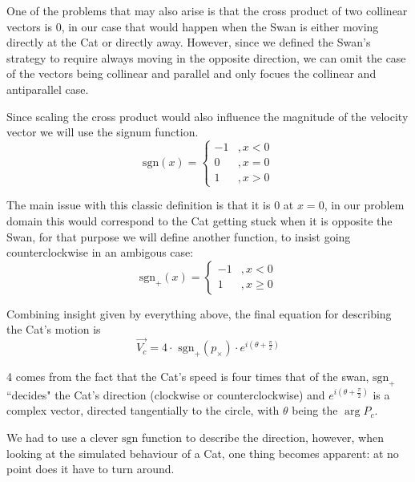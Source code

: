\documentclass[12pt]{article}
\begin{document}
One of the problems that may also arise is that the cross product of two collinear\citep{vectorterminology} vectors is $0$, in our case that would happen when the Swan is either moving directly at the Cat or directly away. However, since we defined the Swan's strategy to require always moving in the opposite direction, we can omit the case of the vectors being collinear and parallel\citep{vectorterminology} and only focues the collinear and antiparallel\citep{vectorterminology} case.

Since scaling the cross product would also influence the magnitude of the velocity vector we will use the signum function. \begin{equation}\text{sgn}(x) = \left\{ 
	\begin{aligned}
		-1&, x < 0\\
		0&, x = 0\\
		1&, x > 0
	\end{aligned}
\right.\end{equation}

The main issue with this classic definition is that it is $0$ at $x = 0$, in our problem domain this would correspond to the Cat getting stuck when it is opposite the Swan, for that purpose we will define another function, to insist going counterclockwise in an ambigous case:\begin{equation}\text{sgn}_+(x) = \left\{ 
	\begin{aligned}
		-1&, x < 0\\
		1&, x \geq 0
	\end{aligned}
\right.\end{equation}

Combining insight given by everything above, the final equation for describing the Cat's motion is \begin{equation}
\vec{V_c} = 4 \cdot \text{ sgn}_+ (p_\times) \cdot e^{i (\theta + \frac{\pi}{2})}
\end{equation}

4 comes from the fact that the Cat's speed is four times that of the swan, $\text{sgn}_+$ ``decides" the Cat's direction (clockwise or counterclockwise) and $e^{i (\theta + \frac{\pi}{2})}$ is a complex vector, directed tangentially to the circle, with $\theta$ being the $\arg P_c$. 

We had to use a clever $\text{sgn}$ function to describe the direction, however, when looking at the simulated behaviour of a Cat, one thing becomes apparent: at no point does it have to turn around.
\end{document}
